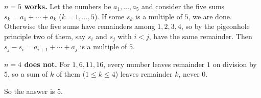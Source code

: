 \textbf{$n=5$ works.} Let the numbers be $a_1,\dots,a_5$ and consider the five sums $s_k=a_1+\cdots+a_k$ ($k=1,\dots,5$). If some $s_k$ is a multiple of $5$, we are done. Otherwise the five sums have remainders among $1,2,3,4$, so by the pigeonhole principle two of them, say $s_i$ and $s_j$ with $i<j$, have the same remainder. Then $s_j-s_i=a_{i+1}+\cdots+a_j$ is a multiple of $5$.

\textbf{$n=4$ does not.} For $1,6,11,16$, every number leaves remainder $1$ on division by $5$, so a sum of $k$ of them ($1\le k\le4$) leaves remainder $k$, never $0$.

So the answer is $\boxed{5}$.
